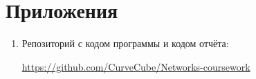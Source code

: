 \section{Приложения} \label{app}

\begin{enumerate}
	\item Репозиторий с кодом программы и кодом отчёта:
	
	\href{https://github.com/CurveCube/Networks_coursework}{https://github.com/CurveCube/Networks-coursework}

\end{enumerate}
